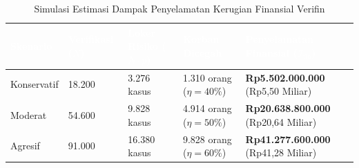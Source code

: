 \documentclass[12pt,a4paper]{article}
\newcommand{\thead}[1]{\textcolor{white}{\textbf{#1}}}
\begin{document}
\begin{adjustwidth}{0.50cm}{0pt}
\begin{table}[H]
\centering
\caption{Simulasi Estimasi Dampak Penyelamatan Kerugian Finansial Verifin}
\label{tab:simulasi-dampak}
\small
\begin{tabularx}{\linewidth}{@{}L{2.5cm}C{1.8cm}C{2.0cm}C{2.2cm}Y@{}}
\toprule
{}\thead{Skenario} & \thead{Verifikasi ($N$)} & \thead{Loker Risiko ($N \cdot p$)} & \thead{Korban Dicegah} & \thead{Penyelamatan Finansial ($\mathcal{I}_{\text{fin}}$)} \\
\midrule
{}
Konservatif & 18.200 & 3.276 kasus & 1.310 orang ($\eta=40\%$) & \textbf{Rp5.502.000.000} (Rp5,50 Miliar) \\
Moderat & 54.600 & 9.828 kasus & 4.914 orang ($\eta=50\%$) & \textbf{Rp20.638.800.000} (Rp20,64 Miliar) \\
Agresif & 91.000 & 16.380 kasus & 9.828 orang ($\eta=60\%$) & \textbf{Rp41.277.600.000} (Rp41,28 Miliar) \\
\bottomrule
\end{tabularx}
\end{table}
\end{adjustwidth}
\end{document}
